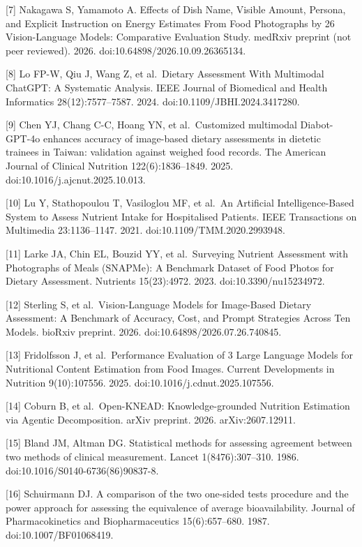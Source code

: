 \documentclass[
  11pt,
  letterpaper]{article}
\begin{document}
{[}7{]} Nakagawa S, Yamamoto A. Effects of Dish Name, Visible Amount, Persona, and Explicit Instruction on
Energy Estimates From Food Photographs by 26 Vision-Language Models: Comparative Evaluation Study. medRxiv
preprint (not peer reviewed). 2026. doi:10.64898/2026.10.09.26365134.

{[}8{]} Lo FP-W, Qiu J, Wang Z, et al.~Dietary Assessment With Multimodal ChatGPT: A Systematic Analysis. IEEE
Journal of Biomedical and Health Informatics 28(12):7577--7587. 2024. doi:10.1109/JBHI.2024.3417280.

{[}9{]} Chen YJ, Chang C-C, Hoang YN, et al.~Customized multimodal Diabot-GPT-4o enhances accuracy of
image-based dietary assessments in dietetic trainees in Taiwan: validation against weighed food records. The
American Journal of Clinical Nutrition 122(6):1836--1849. 2025. doi:10.1016/j.ajcnut.2025.10.013.

{[}10{]} Lu Y, Stathopoulou T, Vasiloglou MF, et al.~An Artificial Intelligence-Based System to Assess
Nutrient Intake for Hospitalised Patients. IEEE Transactions on Multimedia 23:1136--1147. 2021.
doi:10.1109/TMM.2020.2993948.

{[}11{]} Larke JA, Chin EL, Bouzid YY, et al.~Surveying Nutrient Assessment with Photographs of Meals
(SNAPMe): A Benchmark Dataset of Food Photos for Dietary Assessment. Nutrients 15(23):4972. 2023.
doi:10.3390/nu15234972.

{[}12{]} Sterling S, et al.~Vision-Language Models for Image-Based Dietary Assessment: A Benchmark of
Accuracy, Cost, and Prompt Strategies Across Ten Models. bioRxiv preprint. 2026.
doi:10.64898/2026.07.26.740845.

{[}13{]} Fridolfsson J, et al.~Performance Evaluation of 3 Large Language Models for Nutritional Content
Estimation from Food Images. Current Developments in Nutrition 9(10):107556. 2025.
doi:10.1016/j.cdnut.2025.107556.

{[}14{]} Coburn B, et al.~Open-KNEAD: Knowledge-grounded Nutrition Estimation via Agentic Decomposition. arXiv
preprint. 2026. arXiv:2607.12911.

{[}15{]} Bland JM, Altman DG. Statistical methods for assessing agreement between two methods of clinical
measurement. Lancet 1(8476):307--310. 1986. doi:10.1016/S0140-6736(86)90837-8.

{[}16{]} Schuirmann DJ. A comparison of the two one-sided tests procedure and the power approach for assessing
the equivalence of average bioavailability. Journal of Pharmacokinetics and Biopharmaceutics 15(6):657--680.
1987. doi:10.1007/BF01068419.
\end{document}
